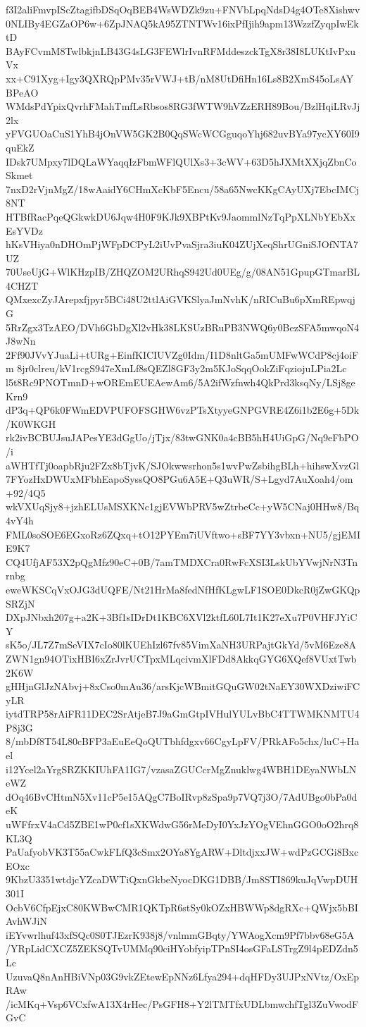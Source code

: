 f3I2aliFmvpIScZtagifbDSqOqBEB4WsWDZk9zu+FNVbLpqNdsD4g4OTe8Xishwv
0NLIBy4EGZaOP6w+6ZpJNAQ5kA95ZTNTWv16ixPfIjih9apm13WzzfZyqpIwEktD
BAyFCvmM8TwlbkjnLB43G4sLG3FEWlrIvnRFMddeszckTgX8r38I8LUKtIvPxuVx
xx+C91Xyg+Igy3QXRQpPMv35rVWJ+tB/nM8UtDfiHn16Ls8B2XmS45oLsAYBPeAO
WMdsPdYpixQvrhFMahTmfLsRbsos8RG3fWTW9hVZzERH89Bou/BzlHqiLRvJj2lx
yFVGUOaCuS1YhB4jOnVW5GK2B0QqSWcWCGguqoYhj682uvBYa97ycXY60I9quEkZ
IDsk7UMpxy7lDQLaWYaqqIzFbmWFlQUlXs3+3cWV+63D5hJXMtXXjqZbnCoSkmet
7nxD2rVjnMgZ/18wAaidY6CHmXcKbF5Encu/58a65NwcKKgCAyUXj7EbcIMCj8NT
HTBfRacPqeQGkwkDU6Jqw4H0F9KJk9XBPtKv9JaommlNzTqPpXLNbYEbXxEsYVDz
hKsVHiya0nDHOmPjWFpDCPyL2iUvPvaSjra3iuK04ZUjXeqShrUGniSJOfNTA7UZ
70UseUjG+WlKHzpIB/ZHQZOM2URhqS942Ud0UEg/g/08AN51GpupGTmarBL4CHZT
QMxexcZyJArepxfjpyr5BCi48U2ttlAiGVKSlyaJmNvhK/nRICuBu6pXmREpwqjG
5RrZgx3TzAEO/DVh6GbDgXl2vHk38LKSUzBRuPB3NWQ6y0BezSFA5mwqoN4J8wNn
2Ff90JVvYJuaLi+tURg+EinfKICIUVZg0Idm/I1D8nltGa5mUMFwWCdP8cj4oiFm
8jr0clreu/kV1rcgS947eXmLf8sQEZl8GF3y2m5KJoSqqOokZiFqziojuLPia2Lc
l5t8Rc9PNOTmnD+wOREmEUEAewAm6/5A2ifWzfnwh4QkPrd3ksqNy/LSj8geKrn9
dP3q+QP6k0FWmEDVPUFOFSGHW6vzPTsXtyyeGNPGVRE4Z6i1b2E6g+5Dk/K0WKGH
rk2ivBCBUJsuJAPesYE3dGgUo/jTjx/83twGNK0a4cBB5hH4UiGpG/Nq9eFbPO/i
aWHTfTj0oapbRju2FZx8bTjvK/SJOkwwsrhon5s1wvPwZsbihgBLh+hihswXvzGl
7FYozHxDWUxMFbhEapoSyssQO8PGu6A5E+Q3uWR/S+Lgyd7AuXoah4/om+92/4Q5
wkVXUqSjy8+jzhELUsMSXKNc1gjEVWbPRV5wZtrbeCc+yW5CNaj0HHw8/Bq4vY4h
FML0soSOE6EGxoRz6ZQxq+tO12PYEm7iUVftwo+sBF7YY3vbxn+NU5/gjEMIE9K7
CQ4UfjAF53X2pQgMfz90eC+0B/7amTMDXCra0RwFcXSI3LskUbYVwjNrN3Tnrnbg
eweWKSCqVxOJG3dUQFE/Nt21HrMa8fedNfHfKLgwLF1SOE0DkcR0jZwGKQpSRZjN
DXpJNbxh207g+a2K+3Bf1sIDrDt1KBC6XVl2ktfL60L7It1K27eXu7P0VHFJYiCY
sK5o/JL7Z7mSeVIX7cIo80lKUEhIzl67fv85VimXaNH3URPajtGkYd/5vM6Eze8A
ZWN1gn94OTixHBI6xZrJvrUCTpxMLqcivmXlFDd8AkkqGYG6XQef8VUxtTwb2K6W
gHHjnGlJzNAbvj+8xCso0mAu36/arsKjcWBmitGQuGW02tNaEY30WXDziwiFCyLR
iytdTRP58rAiFR11DEC2SrAtjeB7J9aGmGtpIVHulYULvBbC4TTWMKNMTU4P8j3G
8/mbDf8T54L80cBFP3aEuEeQoQUTbhfdgxv66CgyLpFV/PRkAFo5chx/luC+Hael
i12Ycel2aYrgSRZKKIUhFA1IG7/vzasaZGUCcrMgZnuklwg4WBH1DEyaNWbLNeWZ
dOq46BvCHtmN5Xv11cP5e15AQgC7BoIRvp8zSpa9p7VQ7j3O/7AdUBgo0bPa0deK
uWFfrxV4aCd5ZBE1wP0cf1sXKWdwG56rMeDyI0YxJzYOgVEhnGGO0oO2hrq8KL3Q
PaUafyobVK3T55aCwkFLfQ3cSmx2OYa8YgARW+DltdjxxJW+wdPzGCGi8BxcEOxc
9KbzU3351wtdjcYZcaDWTiQxnGkbeNyocDKG1DBB/Jm8STI869kuJqVwpDUH301I
OcbV6CfpEjxC80KWBwCMR1QKTpR6stSy0kOZxHBWWp8dgRXc+QWjx5bBIAvhWJiN
iEYvwrlhuf43xfSQc0S0TJEzrK938j8/vnlmmGBqty/YWAogXcm9Pf7bbv68eG5A
/YRpLidCXCZ5ZEKSQTvUMMq90ciHYobfyipTPnSI4osGFaLSTrgZ9l4pEDZdn5Lc
UzuvaQ8nAnHBiVNp03G9vkZEtewEpNNz6Lfya294+dqHFDy3UJPxNVtz/OxEpRAw
/icMKq+Vsp6VCxfwA13X4rHec/PsGFH8+Y2lTMTfxUDLbmwchfTgl3ZuVwodFGvC

